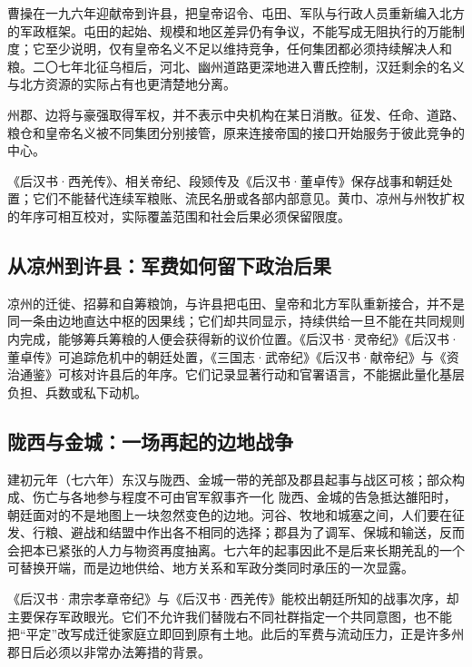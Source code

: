 曹操在一九六年迎献帝到许县，把皇帝诏令、屯田、军队与行政人员重新编入北方的军政框架。屯田的起始、规模和地区差异仍有争议，不能写成无阻执行的万能制度；它至少说明，仅有皇帝名义不足以维持竞争，任何集团都必须持续解决人和粮。二〇七年北征乌桓后，河北、幽州道路更深地进入曹氏控制，汉廷剩余的名义与北方资源的实际占有也更清楚地分离。

\begin{turningpoint}[地方化不是机构突然消失]
州郡、边将与豪强取得军权，并不表示中央机构在某日消散。征发、任命、道路、粮仓和皇帝名义被不同集团分别接管，原来连接帝国的接口开始服务于彼此竞争的中心。
\end{turningpoint}

\begin{sourcenote}[边郡成本的证据]
《后汉书·西羌传》、相关帝纪、段颎传及《后汉书·董卓传》保存战事和朝廷处置；它们不能替代连续军粮账、流民名册或各部内部意见。黄巾、凉州与州牧扩权的年序可相互校对，实际覆盖范围和社会后果必须保留限度。
\end{sourcenote}
\subsection{从凉州到许县：军费如何留下政治后果}

凉州的迁徙、招募和自筹粮饷，与许县把屯田、皇帝和北方军队重新接合，并不是同一条由边地直达中枢的因果线；它们却共同显示，持续供给一旦不能在共同规则内完成，能够筹兵筹粮的人便会获得新的议价位置。《后汉书·灵帝纪》《后汉书·董卓传》可追踪危机中的朝廷处置，《三国志·武帝纪》《后汉书·献帝纪》与《资治通鉴》可核对许县后的年序。它们记录显著行动和官署语言，不能据此量化基层负担、兵数或私下动机。

\subsection{陇西与金城：一场再起的边地战争}
\begin{event}{}{建初元年（七六年）}{东汉与陇西、金城一带的羌部及郡县}{起事与战区可核；部众构成、伤亡与各地参与程度不可由官军叙事齐一化}
陇西、金城的告急抵达雒阳时，朝廷面对的不是地图上一块忽然变色的边地。河谷、牧地和城塞之间，人们要在征发、行粮、避战和结盟中作出各不相同的选择；郡县为了调军、保城和输送，反而会把本已紧张的人力与物资再度抽离。七六年的起事因此不是后来长期羌乱的一个可替换开端，而是边地供给、地方关系和军政分类同时承压的一次显露。

《后汉书·肃宗孝章帝纪》与《后汉书·西羌传》能校出朝廷所知的战事次序，却主要保存军政眼光。它们不允许我们替陇右不同社群指定一个共同意图，也不能把“平定”改写成迁徙家庭立即回到原有土地。此后的军费与流动压力，正是许多州郡日后必须以非常办法筹措的背景。
\end{event}

